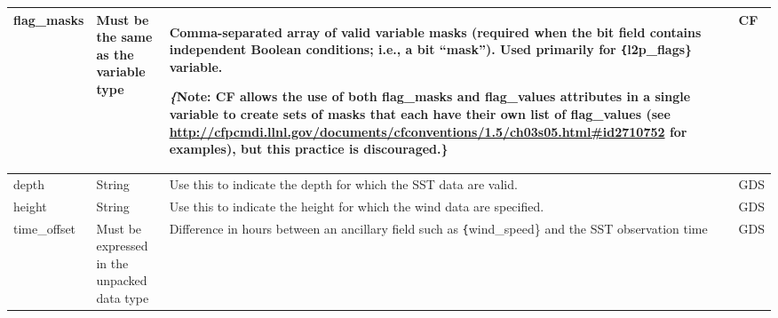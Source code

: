 \begin{longtable}{|p{}|p{}|p{}|p{}|}
\rowcolor{LightCyan} flag\_masks & Must be the same as the variable type & Comma-separated array of valid variable
masks (required when the bit field contains
independent Boolean conditions; i.e., a bit
“mask”). Used primarily for \texttt\{l2p\_flags\}
variable.

\emph\{Note: CF allows the use of both flag\_masks
and flag\_values attributes in a single variable
to create sets of masks that each have their
own list of flag\_values (see \url{http://cfpcmdi.llnl.gov/documents/cfconventions/1.5/ch03s05.html#id2710752} for
examples), but this practice is discouraged.\} & CF \\ \hline

\rowcolor{LightCyan} depth & String & Use this to indicate the depth for which the
SST data are valid. & GDS \\ \hline

\rowcolor{LightCyan} height & String & Use this to indicate the height for which the wind data are specified. & GDS \\ \hline

\rowcolor{LightCyan} time\_offset & Must be expressed in
the unpacked data
type & Difference in hours between an ancillary field such as \texttt\{wind\_speed\} and the SST observation time & GDS \\ \hline

\end{longtable}